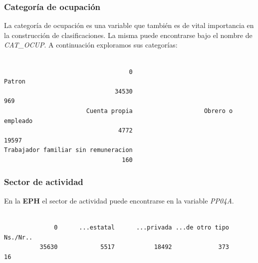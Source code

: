 \documentclass[
]{article}
\newenvironment{Shaded}{\begin{snugshade}}{\end{snugshade}}
\newcommand{\FunctionTok}[1]{\textcolor[rgb]{0.13,0.29,0.53}{\textbf{#1}}}
\newcommand{\NormalTok}[1]{#1}
\newcommand{\SpecialCharTok}[1]{\textcolor[rgb]{0.81,0.36,0.00}{\textbf{#1}}}
\begin{document}
\hypertarget{categoruxeda-de-ocupaciuxf3n-1}{%
\subsubsection{Categoría de ocupación}\label{categoruxeda-de-ocupaciuxf3n-1}}

La categoría de ocupación es una variable que también es de vital importancia en la construcción de clasificaciones. La misma puede encontrarse bajo el nombre de \emph{CAT\_OCUP}. A continuación exploramos sus categorías:

\begin{Shaded}
\end{Shaded}

\begin{verbatim}

                                   0                               Patron 
                               34530                                  969 
                       Cuenta propia                    Obrero o empleado 
                                4772                                19597 
Trabajador familiar sin remuneracion 
                                 160 
\end{verbatim}

\hypertarget{sector-de-actividad-1}{%
\subsubsection{Sector de actividad}\label{sector-de-actividad-1}}

En la \textbf{EPH} el sector de actividad puede encontrarse en la variable \emph{PP04A}.

\begin{Shaded}
\end{Shaded}

\begin{verbatim}

              0      ...estatal      ...privada ...de otro tipo        Ns./Nr.. 
          35630            5517           18492             373              16 
\end{verbatim}
\end{document}
